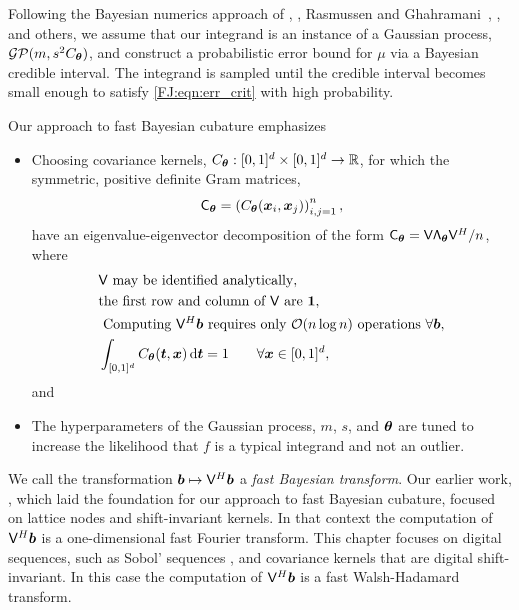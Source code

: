 \documentclass[graybox,footinfo]{svmult}
\begin{document}
Following the Bayesian numerics approach of \cite{Dia88a}, \cite{OHa91a}, Rasmussen and Ghahramani~\cite{RasGha03a}, \cite{BriEtal18a}, and others, we assume that our integrand is an instance of a Gaussian process, $\mathcal{GP}(m,s^2 C_{\boldsymbol{\theta}})$, and construct a probabilistic error bound for $\mu$ via a Bayesian credible interval.  The integrand is sampled until the credible interval becomes small enough to satisfy \eqref{FJ:eqn:err_crit} with high probability.  

Our approach to fast Bayesian cubature \cite{RatHic19a} emphasizes 
\begin{itemize}
    \item Choosing covariance kernels, $C_{\boldsymbol{\theta}}:[0,1]^d \times [0,1]^d \to {\mathbb{R}}$, for which the symmetric, positive definite Gram matrices, 
    \begin{equation} \label{FJ:eq:Gram}
        \mathsf{C}_\bstheta = \left(  C_\bstheta(\bsx_i,\bsx_j)  \right)_{i,j=1}^n,
    \end{equation}
    have an eigenvalue-eigenvector decomposition of the form $\mathsf{C}_{\boldsymbol{\theta}} = \mathsf{V} \mathsf{\Lambda}_{\boldsymbol{\theta}} \mathsf{V}^H/n$, where
    \begin{subequations} \label{FJ:eq:fastcompAssump}
	\begin{align}
	\label{FJ:eq:fastcompAssumpA}
	& \mathsf{V} \text{ may be identified analytically}, \\
	\label{FJ:eq:fastcompAssumpB}
	& \text{the first row and column of $\mathsf{V}$ are } \bsone, \\
	\label{FJ:eq:fastcompAssumpC}
	& \text{ Computing $\mathsf{V}^H \bsb$ requires only $\calO(n \log n)$ operations } \forall \bsb, \\
	\label{FJ:addAssump}
    & \int_{[0,1]^d} C_\bstheta(\bst,\bsx) \, \D \bst = 1 \qquad \forall \bsx \in [0,1]^d,
	\end{align}
\end{subequations}
and
\item The hyperparameters of the Gaussian process, $m$, $s$, and ${\boldsymbol{\theta}}$ are tuned to increase the likelihood that $f$ is a typical integrand and not an outlier.
\end{itemize}
We call the transformation ${\boldsymbol{b}} \mapsto \mathsf{V}^H {\boldsymbol{b}}$ a \emph{fast Bayesian transform}. Our earlier work, \cite{RatHic19a}, which laid the foundation for our approach to fast Bayesian cubature, focused on lattice nodes and shift-invariant kernels. In that context the computation of $\mathsf{V}^H {\boldsymbol{b}}$ is a one-dimensional fast Fourier transform.  This chapter focuses on digital sequences, such as Sobol' sequences \cite{Sob67}, and covariance kernels that are digital shift-invariant.  In this case the computation of $\mathsf{V}^H {\boldsymbol{b}}$ is a fast Walsh-Hadamard transform. 
\end{document}
